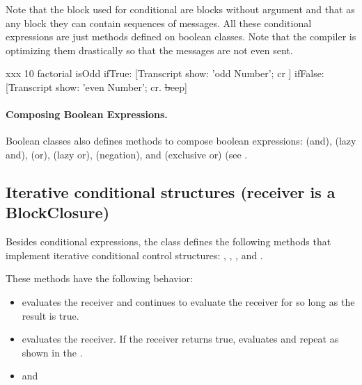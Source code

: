 \documentclass[a4paper,10pt,twoside]{book}
\begin{document}
Note that the block used for conditional are blocks without argument and that as any block they can contain sequences of messages. All these conditional expressions are just methods defined on boolean classes. Note that the compiler is optimizing them drastically so that the messages are not even sent. 


\begin{script}[xxx]{xxx}
10 factorial isOdd
   ifTrue: [Transcript show: 'odd Number'; cr ]
   ifFalse: [Transcript show: 'even Number'; cr. 
                \st beep]
\end{script}

\paragraph{Composing Boolean Expressions.}
Boolean classes also defines methods to compose boolean expressions: 
\index{\lct{\&}} (and), 
  (lazy and),  
\index{|}   (or), 
   (lazy or), 
 (negation), 
and (exclusive or) (see . 

\subsection{Iterative conditional structures (receiver is a BlockClosure)}
Besides conditional expressions, the class  defines the following methods that implement  iterative conditional control structures:      ,  , , and  .

These methods have the following behavior: 
\begin{itemize}
\item {} evaluates the receiver and continues to evaluate the receiver for so long as the result is true.
\item {} evaluates the receiver. If the receiver returns true, evaluates  and repeat as shown in the .
\item {} and  
\end{itemize}
\end{document}
